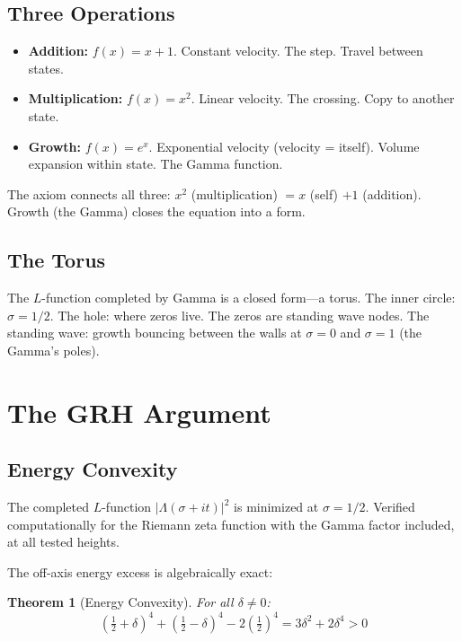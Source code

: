 \documentclass[12pt,a4paper]{article}
\newtheorem{theorem}{Theorem}
\begin{document}
\subsection{Three Operations}

\begin{itemize}[leftmargin=2em]
\item \textbf{Addition:} $f(x) = x + 1$. Constant velocity. The step. Travel between states.
\item \textbf{Multiplication:} $f(x) = x^2$. Linear velocity. The crossing. Copy to another state.
\item \textbf{Growth:} $f(x) = e^x$. Exponential velocity (velocity = itself). Volume expansion within state. The Gamma function.
\end{itemize}

The axiom connects all three: $x^2$ (multiplication) $= x$ (self) $+ 1$ (addition). Growth (the Gamma) closes the equation into a form.

\subsection{The Torus}

The $L$-function completed by Gamma is a closed form---a torus. The inner circle: $\sigma = 1/2$. The hole: where zeros live. The zeros are standing wave nodes. The standing wave: growth bouncing between the walls at $\sigma = 0$ and $\sigma = 1$ (the Gamma's poles).

\section{The GRH Argument}

\subsection{Energy Convexity}

The completed $L$-function $|\Lambda(\sigma+it)|^2$ is minimized at $\sigma = 1/2$. Verified computationally for the Riemann zeta function with the Gamma factor included, at all tested heights.

The off-axis energy excess is algebraically exact:

\begin{theorem}[Energy Convexity]
For all $\delta \neq 0$:
\begin{equation}
\left(\tfrac{1}{2}+\delta\right)^4 + \left(\tfrac{1}{2}-\delta\right)^4 - 2\left(\tfrac{1}{2}\right)^4 = 3\delta^2 + 2\delta^4 > 0
\end{equation}
\end{theorem}
\end{document}
